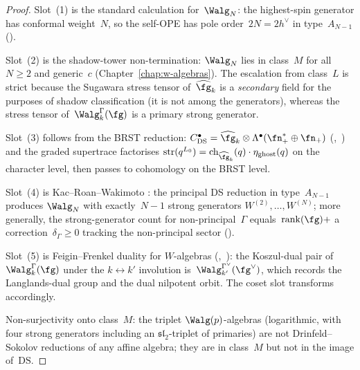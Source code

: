 \begin{proof}
Slot~(1) is the standard calculation for~$\Walg_N$: the highest-spin
generator has conformal weight~$N$, so the self-OPE has pole
order~$2N = 2h^\vee$ in type~$A_{N-1}$
\textup{(}\cite{BouwknegtSchoutens1993}\textup{)}.

Slot~(2) is the shadow-tower non-termination: $\Walg_N$ lies in class~$M$
for all~$N\geq 2$ and generic~$c$
\textup{(}Chapter~\ref{chap:w-algebras}\textup{)}. The escalation from
class~$L$ is strict because the Sugawara stress tensor of~$\widehat{\fg}_k$
is a \emph{secondary} field for the purposes of shadow classification
(it is not among the generators), whereas the stress tensor
of~$\Walg^\Gamma_k(\fg)$ is a primary strong generator.

Slot~(3) follows from the BRST reduction:
$C^\bullet_{\mathrm{DS}} = \widehat{\fg}_k \otimes \Lambda^\bullet(\fn_+^* \oplus \fn_+)$
\textup{(}\cite{deBoerTjin1993},~\cite{FrenkelBenZvi2004}\textup{)}
and the graded supertrace factorises
$\operatorname{str}(q^{L_0}) = \operatorname{ch}_{\widehat{\fg}_k}(q)\cdot\eta_{\mathrm{ghost}}(q)$
on the character level, then passes to cohomology on the BRST level.

Slot~(4) is Kac--Roan--Wakimoto \cite{KacRoanWakimoto2003}: the
principal DS reduction in type~$A_{N-1}$ produces $\Walg_N$ with
exactly~$N-1$ strong generators $W^{(2)},\ldots,W^{(N)}$; more
generally, the strong-generator count for non-principal~$\Gamma$
equals~$\mathrm{rank}(\fg) + $ a correction~$\delta_\Gamma\geq 0$
tracking the non-principal sector
\textup{(}\cite{KacWakimoto2004}\textup{)}.

Slot~(5) is Feigin--Frenkel duality for $W$-algebras
\textup{(}\cite{FeiginFrenkel1992},~\cite{Arakawa2007}\textup{)}:
the Koszul-dual pair of~$\Walg^\Gamma_k(\fg)$ under the
$k \leftrightarrow k'$ involution is~$\Walg^{\Gamma^\vee}_{k'}(\fg^\vee)$,
which records the Langlands-dual group and the dual nilpotent orbit.
The coset slot transforms accordingly.

Non-surjectivity onto class~$M$: the triplet
$\Walg(p)$-algebras
(logarithmic, with four strong generators including an
$\mathfrak{sl}_2$-triplet of primaries) are not Drinfeld--Sokolov
reductions of any affine algebra; they are in class~$M$ but not in
the image of~$\mathrm{DS}$.
\end{proof}

